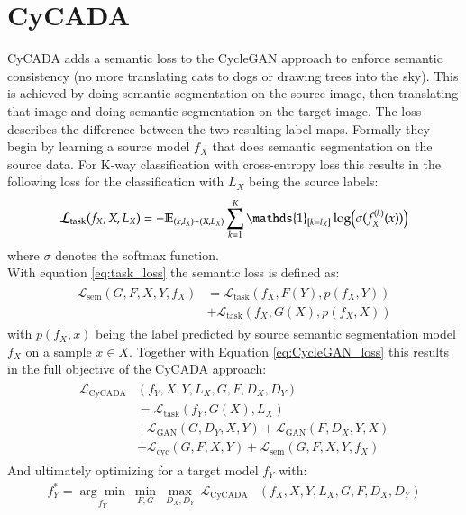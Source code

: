 \section{CyCADA} 
CyCADA \cite{DBLP:journals/corr/abs-1711-03213} adds a semantic loss to the CycleGAN approach to enforce semantic consistency (no more translating cats to dogs or drawing trees into the sky). This is achieved by doing semantic segmentation on the source image, then translating that image and doing semantic segmentation on the target image. The loss describes the difference between the two resulting label maps. Formally they begin by learning a source model $f_X$ that does semantic segmentation on the source data. For K-way classification with cross-entropy loss this results in the following loss for the classification with $L_X$ being the source labels:
\begin{align}
	\mathcal{L}_{\text{task}}(f_X, X, L_X) = -\mathbb{E}_{(x, l_X)\sim(X, L_X)}\sum_{k=1}^{K}\mathds{1}_{[k=l_X]}\log\Bigl(\sigma(f_X^{(k)}(x))\Bigr) \label{eq:task_loss} 
\end{align}
where $\sigma$ denotes the softmax function.\\
With equation \ref{eq:task_loss} the semantic loss is defined as:
\begin{align}
	\begin{split}
		\mathcal{L}_{\text{sem}}(G, F, X, Y, f_X) &= \mathcal{L}_{\text{task}}(f_X, F(Y), p(f_X, Y))\\
		&+ \mathcal{L}_{\text{task}}(f_X, G(X), p(f_X, X))
	\end{split}
\end{align}
with $p(f_X, x)$ being the label predicted by source semantic segmentation model $f_X$ on a sample $x \in X$. Together with Equation \ref{eq:CycleGAN_loss} this results in the full objective of the CyCADA approach:
\begin{align}
	\begin{split}
		\mathcal{L}_{\text{CyCADA}}&(f_Y, X, Y, L_X, G, F, D_X, D_Y)\\
		&= \mathcal{L}_{\text{task}}(f_Y, G(X), L_X)\\
		&+ \mathcal{L}_{\text{GAN}}(G, D_Y, X, Y) + \mathcal{L}_{\text{GAN}}(F, D_X, Y, X)\\
		&+ \mathcal{L}_{\text{cyc}}(G, F, X, Y) + \mathcal{L}_{\text{sem}}(G, F, X, Y, f_X)
	\end{split}
\end{align}
And ultimately optimizing for a target model $f_Y$ with:
\begin{align}
	f^*_Y = \underset{f_Y}{\arg\min} ~ \underset{F,G}{\min} ~ \underset{D_X, D_Y}{\max} ~ \mathcal{L}_{\text{CyCADA}}&(f_X, X, Y, L_X, G, F, D_X, D_Y)
\end{align}

